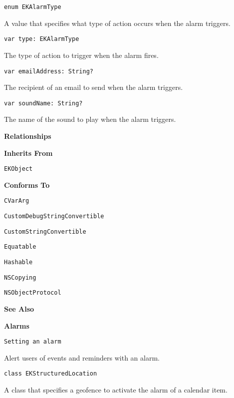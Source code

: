 \documentclass{article}
\begin{document}
\texttt{enum EKAlarmType}

A value that specifies what type of action occurs when the alarm triggers.

\texttt{var type: EKAlarmType}

The type of action to trigger when the alarm fires.

\texttt{var emailAddress: String?}

The recipient of an email to send when the alarm triggers.

\texttt{var soundName: String?}

The name of the sound to play when the alarm triggers.

\textbf{Relationships}

\textbf{Inherits From}

\texttt{EKObject}

\textbf{Conforms To}

\texttt{CVarArg}

\texttt{CustomDebugStringConvertible}

\texttt{CustomStringConvertible}

\texttt{Equatable}

\texttt{Hashable}

\texttt{NSCopying}

\texttt{NSObjectProtocol}

\textbf{See Also}

\textbf{Alarms}

\texttt{Setting an alarm}

Alert users of events and reminders with an alarm.

\texttt{class EKStructuredLocation}

A class that specifies a geofence to activate the alarm of a calendar item.

\newpage
\end{document}
